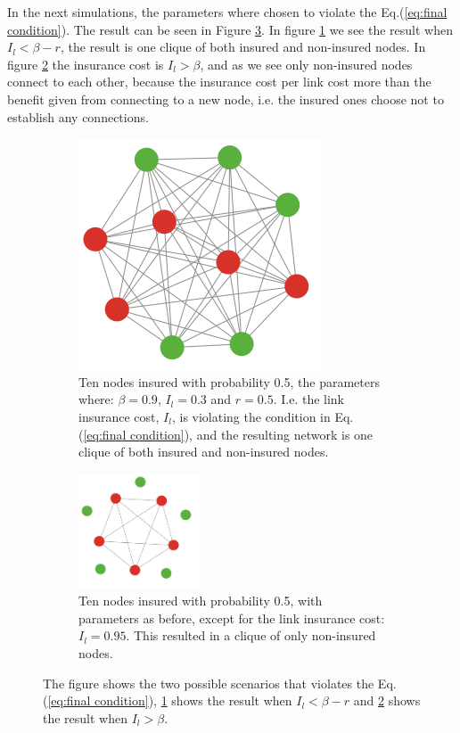 In the next simulations, the parameters where chosen to violate the Eq.(\ref{eq:final condition}). The result can be seen in Figure \ref{fig:SimulationViolating}.  In figure \ref{fig:SimulationViolating:a} we see the result when $I_{l}<\beta-r$, the result is one clique of both insured and non-insured nodes. In figure \ref{fig:SimulationViolating:b} the insurance cost is $I_{l}>\beta$, and as we see only non-insured nodes connect to each other, because the insurance cost per link cost more than the benefit given from connecting to a new node, i.e. the insured ones choose not to establish any connections. 
\begin{figure}[h]
\centering
\begin{subfigure}{.5\textwidth}
  \centering
\includegraphics[width=0.4\linewidth]{../Figures/FirstSimulationViolatingResult.png}

\caption{\label{fig:SimulationViolating:a} Ten nodes insured with probability 0.5, the parameters where: $\beta=0.9$, $I_{l}=0.3$ and $r=0.5$. I.e. the link insurance cost, $I_{l}$, is violating the condition in Eq.(\ref{eq:final condition}), and the resulting network is one clique of both insured and non-insured nodes.}
\end{subfigure}
\quad
\begin{subfigure}{0.46\textwidth}
\centering
\includegraphics[width=0.4\textwidth]{../Figures/SimulationViolating2.png}

\caption{\label{fig:SimulationViolating:b} Ten nodes insured with probability 0.5, with parameters as before, except for the link insurance cost:$I_{l}=0.95$. This resulted in a clique of only non-insured nodes. }
\end{subfigure}
\caption{\label{fig:SimulationViolating} The figure shows the two possible scenarios that violates the Eq.(\ref{eq:final condition}), \ref{fig:SimulationViolating:a} shows the result when $I_{l}<\beta-r$ and \ref{fig:SimulationViolating:b} shows the result when $I_{l}>\beta$.}
\end{figure}

